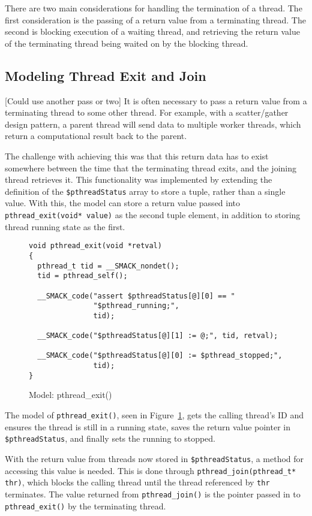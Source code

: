 There are two main considerations for handling the termination of a
thread.  The first consideration is the passing of a return value from
a terminating thread.  The second is blocking execution of a waiting
thread, and retrieving the return value of the terminating thread
being waited on by the blocking thread.

\subsection{Modeling Thread Exit and Join}
[Could use another pass or two]
It is often necessary to pass a return value from a terminating thread
to some other thread.  For example, with a scatter/gather design
pattern, a parent thread will send data to multiple worker threads,
which return a computational result back to the parent.

The challenge with achieving this was that this return data has to
exist somewhere between the time that the terminating thread exits,
and the joining thread retrieves it.  This functionality was
implemented by extending the definition of the
\lstinline|$pthreadStatus| array to store a tuple, rather than a 
single value.  With this, the model can store a return value passed
into \lstinline|pthread_exit(void* value)| as the second tuple
element, in addition to storing thread running state as the first.

\begin{figure}[h]
\centering
\caption{Model: pthread\_exit()}\label{fig:pthread_exit}
\begin{lstlisting}
void pthread_exit(void *retval)
{
  pthread_t tid = __SMACK_nondet();
  tid = pthread_self();

  __SMACK_code("assert $pthreadStatus[@][0] == "
               "$pthread_running;",
               tid);

  __SMACK_code("$pthreadStatus[@][1] := @;", tid, retval);

  __SMACK_code("$pthreadStatus[@][0] := $pthread_stopped;",
               tid);
}
\end{lstlisting}
\end{figure}

The model of \lstinline|pthread_exit()|, seen in
Figure~\ref{fig:pthread_exit}, gets the calling thread's ID and
ensures the thread is still in a running state, saves the return value
pointer in \lstinline|$pthreadStatus|, and finally sets the running to
stopped.  


With the return value from threads now stored in
\lstinline|$pthreadStatus|, a method for accessing this value is
needed.  This is done through 
\lstinline|pthread_join(pthread_t* thr)|, which blocks the calling
thread until the thread referenced  by \lstinline|thr| terminates.
The value returned from \lstinline|pthread_join()| is the pointer
passed in to \lstinline|pthread_exit()| by the terminating thread.

